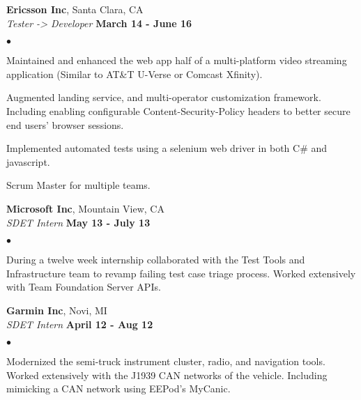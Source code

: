 \documentclass[margin,line]{res}
\newenvironment{list2}{
  \begin{list}{$\bullet$}{
      \setlength{\itemsep}{0in}
      \setlength{\parsep}{0in} \setlength{\parskip}{0in}
      \setlength{\topsep}{0in} \setlength{\partopsep}{0in} 
      \setlength{\leftmargin}{0.2in}}}{\end{list}}
\begin{document}
\begin{resume}
    {\bf Ericsson Inc}, Santa Clara, CA\\
    {\em Tester -> Developer} \hfill {\bf March 14 - June 16}\\
  \begin{list2}
    \item Maintained and enhanced the web app half of a multi-platform video streaming application (Similar to AT\&T U-Verse or Comcast Xfinity). 
    \item Augmented landing service, and multi-operator customization framework. Including enabling configurable Content-Security-Policy headers to better secure end users’ browser sessions.
    \item Implemented automated tests using a selenium web driver in both C\# and javascript.
    \item Scrum Master for multiple teams.
  \end{list2}

    {\bf Microsoft Inc}, Mountain View, CA\\
    {\em SDET Intern} \hfill {\bf May 13 - July 13}\\
  \begin{list2}
    \item During a twelve week internship collaborated with the Test Tools and Infrastructure team to revamp failing test case triage process. Worked extensively with Team Foundation Server APIs.
  \end{list2}

    {\bf Garmin Inc}, Novi, MI\\
    {\em SDET Intern} \hfill {\bf April 12 - Aug 12}\\
  \begin{list2}
    \item Modernized the semi-truck instrument cluster, radio, and navigation tools. Worked extensively with the J1939 CAN networks of the vehicle. Including mimicking a CAN network using EEPod’s MyCanic.
  \end{list2}




\end{resume}
\end{document}
